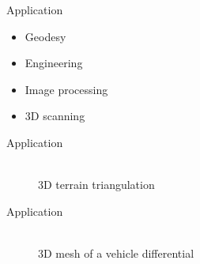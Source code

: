\documentclass[10pt]{beamer}
\begin{document}
\begin{frame}{Application}
	\begin{itemize}
		\item \alert{Geodesy}
		\item \alert{Engineering}
		\item \alert{Image processing}
		\item \alert{3D scanning} 
	\end{itemize}
\end{frame}

\begin{frame}{Application}
	\begin{figure}[h]
			\\ 3D terrain triangulation
	\end{figure}
\end{frame}

\begin{frame}{Application}
	\begin{figure}[h]
			\\ 3D mesh of a vehicle differential 
	\end{figure}
\end{frame}
\end{document}
